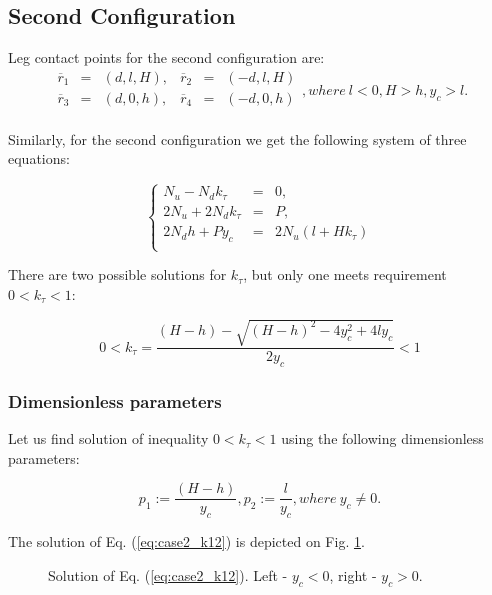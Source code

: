 \documentclass{ws-procs9x6}
\begin{document}
\subsection{Second Configuration}

Leg contact points for the second configuration are:
\begin{equation}
\label{eq:step_points_phase_2}
\begin{array}{rccccl}
  \overline{r}_1 &=& (d, l, H) , &\overline{r}_2 &=& (-d, l, H) \\
  \overline{r}_3 &=& (d, 0, h) , &\overline{r}_4 &=& (-d, 0, h) \\
\end{array}, where~l<0,H>h,y_c>l.
\end{equation}

Similarly, for the second configuration we get the following system of three equations:

\begin{equation}
\label{eq:case2_final_equations}
\left\{
\begin{array}{rcl}
N_u - N_dk_\tau &=& 0,\\
2N_u + 2N_d k_\tau &=& P,\\
2 N_d h + P y_c &=& 2 N_u (l + H k_\tau)\\
\end{array}
\right.
\end{equation}

There are two possible solutions for $k_\tau$, but only one meets requirement $0<k_\tau<1$:

\begin{equation}
  \label{eq:case2_k12}
 0 < k_\tau = \dfrac{(H-h) - \sqrt{(H-h)^2 - 4y^2_c + 4ly_c}}{2y_c} < 1
\end{equation}


\subsubsection{Dimensionless parameters}
Let us find solution of inequality $0<k_\tau<1$ using the following dimensionless parameters:

\begin{equation}
\label{eq:case2_dimentionless}
  p_1 := \dfrac{(H-h)}{y_c}, p_2 := \dfrac{l}{y_c}, where~y_c \ne 0.
\end{equation}

The solution of Eq. (\ref{eq:case2_k12}) is depicted on Fig. \ref{aba:case2_dimless_figure}.


\begin{figure}
  \begin{center}
  \end{center}
  \caption{Solution of Eq. (\ref{eq:case2_k12}). Left - $y_c<0$, right - $y_c>0$.}
  \label{aba:case2_dimless_figure}
\end{figure}
\end{document}
